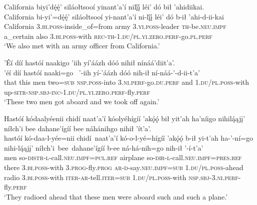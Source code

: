 \ea\label{ex:text9-5-2}
California biyi’dę́ę́’ siláołtsooí yinant’a’í nilį́į́ léi’ dó bił ’ahidiikai.\\
\gll California	bi-yi’=dę́ę́’	siláołtsooí	yi-nant’a’í	ni-lį́į́	léi’	dó	b-ił	’ahi-d-ii-kai\\
     California	3.\textsc{bi}.\textsc{poss}-inside\_of=from	army	3.\textsc{yi}.\textsc{poss}-leader	\textsc{th}-be.\textsc{neu}.\textsc{impf}	a\_certain	also	3.\textsc{bi}.\textsc{poss}-with	\textsc{rec}-\textsc{th}-1.\textsc{du}/\textsc{pl}.\textsc{yi}.\textsc{zero}.\textsc{perf}-go.\textsc{pl}.\textsc{perf}\\
\glt `We also met with an army officer from California.'
\z

\newpage
\ea\label{ex:text9-5-3}
’Éí díí hastóí naakigo ’iih yí’áázh dóó nihił nínáá’diit’a’.\\
\gll ’éí	díí	hastóí	naaki=go	~{’-iih}	yí-’áázh	dóó	nih-ił	ní-náá-’-d-ii-t’a’\\
     that	this	men	two=\textsc{sub}	\textsc{nsp}.\textsc{poss}-into	3.\textsc{ni}.\textsc{perf}-go.\textsc{du}.\textsc{perf}	and	1.\textsc{du}/\textsc{pl}.\textsc{poss}-with	up-\textsc{sitr}-\textsc{nsp}.\textsc{sbj}-\textsc{inc}-1.\textsc{du}/\textsc{pl}.\textsc{yi}.\textsc{zero}.\textsc{perf}-fly.\textsc{perf}\\
\glt `These two men got aboard and we took off again.'
\z

\ea\label{ex:text9-5-4}
Hastóí kódaalyéenii chidí naat’a’í kóolyéhígíí ’akǫ́ǫ́ bił yit’ah ha’níigo nihilą́ąjį’ níłch’i bee dahane’ígíí bee náhánihgo nihił ’ít’a’.\\
\gll hastóí	kó-daa-l-yée=nii	chidí~{naat’a’í}	kó-o-l-yé=hígíí	’akǫ́ǫ́	b-ił	yi-t’ah	ha-’-ní=go	nihi-lą́ąjį’	níłch’i~bee~{dahane’ígíí}	b-ee	ná-há-nih=go	nih-ił	’-í-t’a’\\
     men	so-\textsc{distr}-\textsc{l}-call.\textsc{neu}.\textsc{impf}=\textsc{pcl}.\textsc{ref}	airplane	so-\textsc{dir}-\textsc{l}-call.\textsc{neu}.\textsc{impf}=\textsc{pres}.\textsc{ref}	there	3.\textsc{bi}.\textsc{poss}-with	3.\textsc{prog}-fly.\textsc{prog}	\textsc{ar}-\textsc{d}-say.\textsc{neu}.\textsc{impf}=\textsc{sub}	1.\textsc{du}/\textsc{pl}.\textsc{poss}-ahead	radio	3.\textsc{bi}.\textsc{poss}-with	\textsc{iter}-\textsc{ar}-tell.\textsc{iter}=\textsc{sub}	1.\textsc{du}/\textsc{pl}.\textsc{poss}-with	\textsc{nsp}.\textsc{sbj}-3.\textsc{ni}.\textsc{perf}-fly.\textsc{perf}\\
\glt `They radioed ahead that these men were aboard such and such a plane.'
\z

